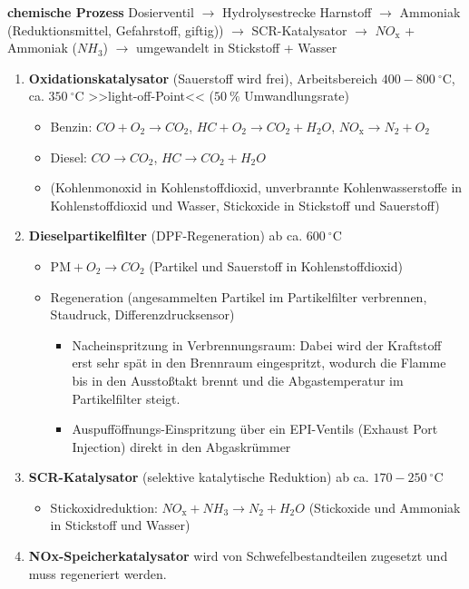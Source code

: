 \textbf{chemische Prozess} Dosierventil $\to$ Hydrolysestrecke
Harnstoff $\to$ Ammoniak (Reduktionsmittel, Gefahrstoff, giftig))
$\to$ SCR-Katalysator $\to$ $NO_\text{x}$ + Ammoniak
($NH_\text{3}$) $\to$ umgewandelt in Stickstoff + Wasser

\begin{enumerate}
\item
  \textbf{Oxidationskatalysator} (Sauerstoff wird frei), Arbeitsbereich
  $400 - 800~^\circ\text{C}$, ca. $350~^\circ\text{C}$
  >>light-off-Point<< ($50~\%$ Umwandlungsrate)

  \begin{itemize}
  \item
    Benzin: $CO + O_2 \to CO_2$, $HC + O_2 \to CO_2 + H_{2}O$,
    $NO_\text{x} \to N_2 + O_2$
  \item
    Diesel: $CO \to CO_2$, $HC \to CO_2 + H_{2}O$
  \item
    (Kohlenmonoxid in Kohlenstoffdioxid, unverbrannte Kohlenwasserstoffe
    in Kohlenstoffdioxid und Wasser, Stickoxide in Stickstoff und
    Sauerstoff)
  \end{itemize}
\item
  \textbf{Dieselpartikelfilter} (DPF-Regeneration) ab ca.
  $600~^\circ\text{C}$

  \begin{itemize}
  \item
    $\text{PM} + O_2 \to CO_{2}$ (Partikel und Sauerstoff in
    Kohlenstoffdioxid)
  \item
    Regeneration (angesammelten Partikel im Partikelfilter verbrennen,
    Staudruck, Differenzdrucksensor)

    \begin{itemize}
    \item
      Nacheinspritzung in Verbrennungsraum: Dabei wird der Kraftstoff
      erst sehr spät in den Brennraum eingespritzt, wodurch die Flamme
      bis in den Ausstoßtakt brennt und die Abgastemperatur im
      Partikelfilter steigt.
    \item
      Auspufföffnungs-Einspritzung über ein EPI-Ventils (Exhaust Port
      Injection) direkt in den Abgaskrümmer
    \end{itemize}
  \end{itemize}
\item
  \textbf{SCR-Katalysator} (selektive katalytische Reduktion) ab ca.
  $170 - 250~^\circ\text{C}$

  \begin{itemize}
  \item
    Stickoxidreduktion: $NO_\text{x} + NH_\text{3} \to N_2 + H_{2}O$
    (Stickoxide und Ammoniak in Stickstoff und Wasser)
  \end{itemize}
\item
  \textbf{NOx-Speicherkatalysator} wird von Schwefelbestandteilen
  zugesetzt und muss regeneriert werden.
\end{enumerate}

